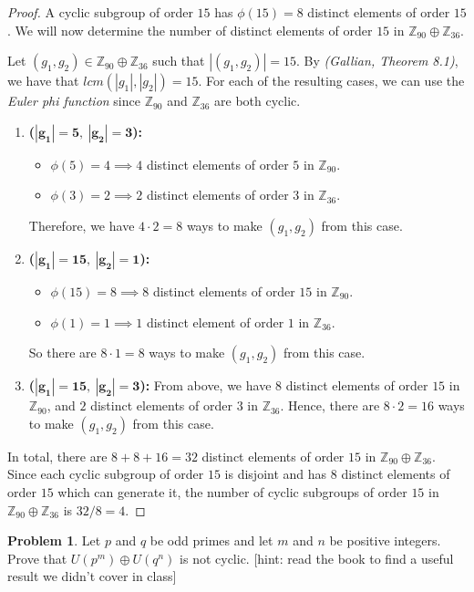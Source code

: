\documentclass[12pt,reqno]{article}
\newcommand{\Z}{\mathbb{Z}}
\theoremstyle{plain}
\theoremstyle{definition}
\newtheorem{problem}{Problem}
\begin{document}
\begin{proof}
    A cyclic subgroup of order \(15\) has \(\phi(15)=8\) distinct elements of order \(15\).
    We will now determine the number of distinct elements of order \(15\) in \(\Z_{90}\oplus\Z_{36}\).
    
    Let \((g_1,g_2)\in\Z_{90}\oplus\Z_{36}\) such that \(|(g_1,g_2)|=15\).
    By \emph{(Gallian, Theorem 8.1)}, we have that \(lcm(|g_1|,|g_2|)=15\).
    For each of the resulting cases, we can use the \emph{Euler phi function} since \(\Z_{90}\) and
    \(\Z_{36}\) are both cyclic.
    \begin{enumerate}
        \item \textbf{(\(\mathbf{|g_1|=5,\ |g_2|=3}\)):} 
            \begin{itemize}
                \item \(\phi(5)=4\implies 4\) distinct elements of order
                \(5\) in \(\Z_{90}\).
                \item \(\phi(3)=2\implies 2\) distinct elements of order \(3\) in \(\Z_{36}\).
            \end{itemize}
            Therefore, we have \(4\cdot 2=8\) ways to make \((g_1,g_2)\) from this case.
        
        \item \textbf{(\(\mathbf{|g_1|=15,\ |g_2|=1}\)):} 
            \begin{itemize}
                \item \(\phi(15)=8\implies 8\) distinct elements of order
                \(15\) in \(\Z_{90}\).
                \item \(\phi(1)=1\implies 1\) distinct element of order \(1\) in \(\Z_{36}\).
            \end{itemize}
            So there are \(8\cdot 1=8\) ways to make \((g_1,g_2)\) from this case.
        
        \item \textbf{(\(\mathbf{|g_1|=15,\ |g_2|=3}\)):} 
            From above, we have \(8\) distinct elements of order
            \(15\) in \(\Z_{90}\), and \(2\) distinct elements of order \(3\) in \(\Z_{36}\).
            Hence, there are \(8\cdot 2=16\) ways to make \((g_1,g_2)\) from this case.
    \end{enumerate}
    In total, there are \(8+8+16=32\) distinct elements of order \(15\) in \(\Z_{90}\oplus\Z_{36}\). Since
    each cyclic subgroup of order \(15\) is disjoint and has \(8\) distinct elements of order \(15\)
    which can generate it, the number of cyclic subgroups of order \(15\) in \(\Z_{90}\oplus\Z_{36}\) is \(32/8=4\).
\end{proof}

\newpage
    

\begin{problem} 
    Let $p$ and $q$ be odd primes and let $m$ and $n$ be positive integers. Prove that $U(p^m) \oplus U(q^n)$ is not cyclic. [hint: read the book to find a useful result we didn't cover in class]
\end{problem}
\end{document}
